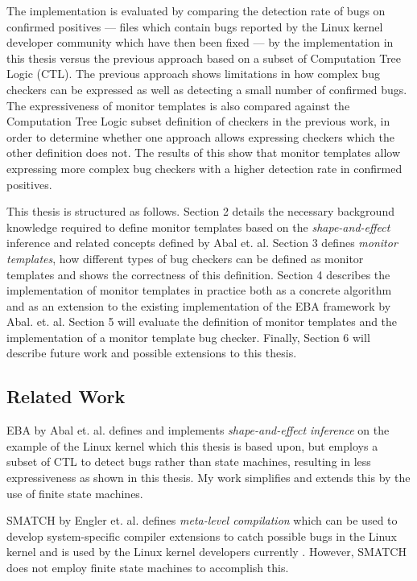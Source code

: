 \newpar The implementation is evaluated by comparing the detection rate of bugs on confirmed positives --- files which contain bugs reported by the Linux kernel developer community which have then been fixed --- by the implementation in this thesis versus the previous approach based on a subset of Computation Tree Logic (CTL). The previous approach shows limitations in how complex bug checkers can be expressed as well as detecting a small number of confirmed bugs. The expressiveness of monitor templates is also compared against the Computation Tree Logic subset definition of checkers in the previous work, in order to determine whether one approach allows expressing checkers which the other definition does not. The results of this show that monitor templates allow expressing more complex bug checkers with a higher detection rate in confirmed positives.   

\newpar This thesis is structured as follows. Section 2 details the necessary background knowledge required to define monitor templates based on the \textit{shape-and-effect} inference and related concepts defined by Abal et. al. Section 3 defines \textit{monitor templates}, how different types of bug checkers can be defined as monitor templates and shows the correctness of this definition. Section 4 describes the implementation of monitor templates in practice both as a concrete algorithm and as an extension to the existing implementation of the EBA framework by Abal. et. al. Section 5 will evaluate the definition of monitor templates and the implementation of a monitor template bug checker. Finally, Section 6 will describe future work and possible extensions to this thesis.    

\subsection{Related Work}
EBA by Abal et. al. defines and implements \textit{shape-and-effect inference} on the example of the Linux kernel \cite{Abal2017EffectiveBF} which this thesis is based upon, but employs a subset of CTL to detect bugs rather than state machines, resulting in less expressiveness as shown in this thesis. My work simplifies and extends this by the use of finite state machines. 

\newpar SMATCH by Engler et. al. defines \textit{meta-level compilation} which can be used to develop system-specific compiler extensions to catch possible bugs in the Linux kernel and is used by the Linux kernel developers currently \cite{smatch}. However, SMATCH does not employ finite state machines to accomplish this. 

